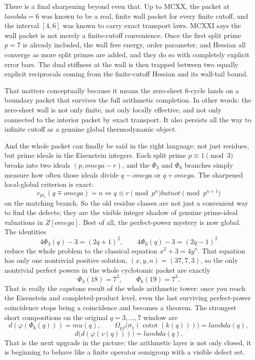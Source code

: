 \documentclass[11pt]{article}
\def\mathbb#1{#1}%
\def\mathrm#1{#1}%
\def\text#1{#1}%
\def\omega{omega}%
\def\lambda{lambda}%
\def\mu{mu}%
\def\Phi#1{Phi#1}%
\def\pi{pi}%
\begin{document}
There is a final sharpening beyond even that. Up to MCXX, the packet at $\lambda=6$ was known to be a real,
finite wall packet for every finite cutoff, and the interval $[4,6]$ was known to carry exact transport laws.
MCXXI says the wall packet is not merely a finite-cutoff convenience. Once the first split prime $p=7$ is already
included, the wall free energy, order parameter, and Hessian all converge as more split primes are added, and they do
so with completely explicit error bars. The dual stiffness at the wall is then trapped between two equally explicit
reciprocals coming from the finite-cutoff Hessian and its wall-tail bound.

That matters conceptually because it means the zero-sheet $6$-cycle lands on a boundary packet that survives the full
arithmetic completion. In other words: the zero-sheet wall is not only finite, not only locally effective, and not
only connected to the interior packet by exact transport. It also persists all the way to infinite cutoff as a genuine
global thermodynamic object.

And the whole packet can finally be said in the right language: not just residues, but prime ideals in the Eisenstein integers. Each split prime $p\equiv1\pmod3$ breaks into two ideals $(p,\omega-r)$, and the $\Phi_3$ and $\Phi_6$ branches simply measure how often those ideals divide $q-\omega$ or $q+\omega$.
The sharpened local-global criterion is exact:
\[
v_{\pi_r}(q\mp\omega)=n
\iff
q\equiv r \pmod{p^n}
\text{ but not }\pmod{p^{n+1}}
\]
on the matching branch. So the old residue classes are not just a convenient way to find the defects; they are the visible integer shadow of genuine prime-ideal valuations in $\mathbb Z[\omega]$.
Best of all, the perfect-power mystery is now global. The identities
\[
4\Phi_3(q)-3=(2q+1)^2,
\qquad
4\Phi_6(q)-3=(2q-1)^2
\]
reduce the whole problem to the classical equation $x^2+3=4y^n$. That equation has only one nontrivial positive solution, $(x,y,n)=(37,7,3)$, so the only nontrivial perfect powers in the whole cyclotomic packet are exactly
\[
\Phi_3(18)=7^3,
\qquad
\Phi_6(19)=7^3.
\]
That is really the capstone result of the whole arithmetic tower: once you reach the Eisenstein and completed-product level, even the last surviving perfect-power coincidence stops being a coincidence and becomes a theorem.
The strongest short compositions on the original $q=3,\dots,7$ window are
\[
d(\varphi(\Phi_6(q))) = \mu(q), \qquad \Omega_{\mathrm{pf}}\!\bigl(\sigma_1(\operatorname{cotot}(k(q)))\bigr)=\lambda(q),
\]
\[
d\bigl(d(\varphi(v(q)))\bigr) = \lambda(q).
\]
That is the next upgrade in the picture: the arithmetic layer is not only closed, it is beginning to behave like a finite operator semigroup with a visible defect set.
\end{document}
